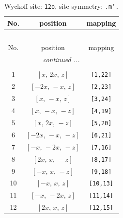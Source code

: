 \documentclass[fleqn,8pt]{jsarticle}
\begin{document}
\begin{longtable}{ccc}
\caption{Wyckoff site: {\tt 12o}, site symmetry: {\tt .m'.}}
 \\
 \hline \hline
No. & position & mapping \\ \hline \endfirsthead

\multicolumn{2}{l}{\tablename\ \thetable{}} \\
 \hline \hline
No. & position & mapping \\ \hline \endhead

 \hline \hline
\multicolumn{2}{r}{\footnotesize\it continued ...} \\ \endfoot

 \hline \hline
\multicolumn{2}{r}{} \\ \endlastfoot

1 & $\left[ x,\, 2 x,\, z \right]$ & {\tt [1,22]} \\ \hline
2 & $\left[ - 2 x,\, - x,\, z \right]$ & {\tt [2,23]} \\ \hline
3 & $\left[ x,\, - x,\, z \right]$ & {\tt [3,24]} \\ \hline
4 & $\left[ x,\, - x,\, - z \right]$ & {\tt [4,19]} \\ \hline
5 & $\left[ x,\, 2 x,\, - z \right]$ & {\tt [5,20]} \\ \hline
6 & $\left[ - 2 x,\, - x,\, - z \right]$ & {\tt [6,21]} \\ \hline
7 & $\left[ - x,\, - 2 x,\, - z \right]$ & {\tt [7,16]} \\ \hline
8 & $\left[ 2 x,\, x,\, - z \right]$ & {\tt [8,17]} \\ \hline
9 & $\left[ - x,\, x,\, - z \right]$ & {\tt [9,18]} \\ \hline
10 & $\left[ - x,\, x,\, z \right]$ & {\tt [10,13]} \\ \hline
11 & $\left[ - x,\, - 2 x,\, z \right]$ & {\tt [11,14]} \\ \hline
12 & $\left[ 2 x,\, x,\, z \right]$ & {\tt [12,15]} \\
\end{longtable}
\renewcommand{\arraystretch}{1.2}
\end{document}
